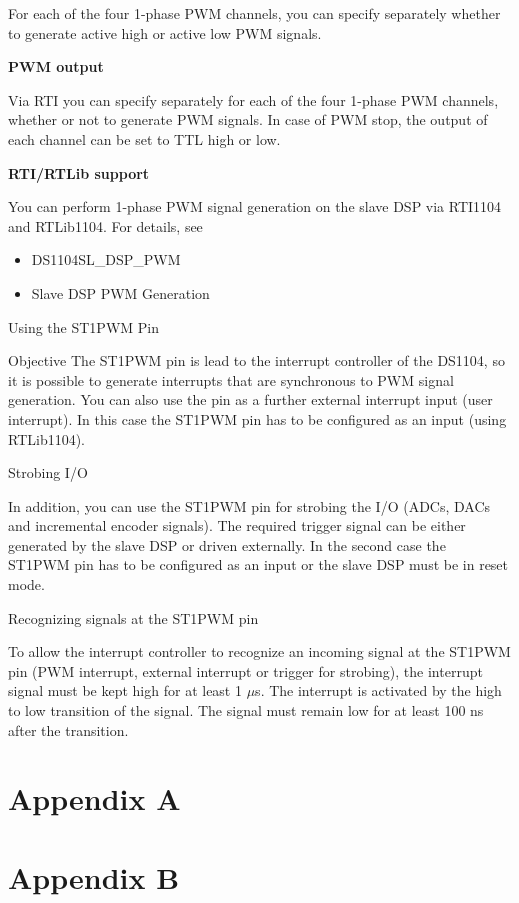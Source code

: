 For each of the four 1-phase PWM channels, you can specify separately whether to generate active high or active low PWM signals.

\noindent \textbf{PWM output}\par
Via RTI you can specify separately for each of the four 1-phase PWM channels, whether or not to generate PWM signals. In case of PWM stop, the output of each channel can be set to TTL high or low.

\noindent \textbf{RTI/RTLib support}\par
You can perform 1-phase PWM signal generation on the slave DSP via RTI1104 and RTLib1104. For details, see
\begin{itemize}
    \item DS1104SL\_DSP\_PWM
    \item Slave DSP PWM Generation
\end{itemize}

Using the ST1PWM Pin

Objective
The ST1PWM pin is lead to the interrupt controller of the DS1104, so it is possible to generate interrupts that are synchronous to PWM signal generation. You can also use the pin as a further external interrupt input (user interrupt). In this case the ST1PWM pin has to be configured as an input (using RTLib1104).

Strobing I/O

In addition, you can use the ST1PWM pin for strobing the I/O (ADCs, DACs and incremental encoder signals). The required trigger signal can be either generated by the slave DSP or driven externally. In the second case the ST1PWM pin has to be configured as an input or the slave DSP must be in reset mode.

Recognizing signals at the ST1PWM pin

To allow the interrupt controller to recognize an incoming signal at the ST1PWM pin (PWM interrupt, external interrupt or trigger for strobing), the interrupt signal must be kept high for at least 1 $\mu$s. The interrupt is activated by the high to low transition of the signal. The signal must remain low for at least 100 ns after the transition.

\newpage 






\newpage
\printbibliography[
heading=bibintoc,
title={References}
]

\newpage
\appendix
\section*{Appendix A}
\section*{Appendix B}

